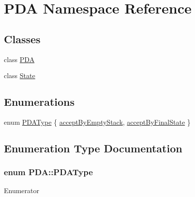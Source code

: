 \hypertarget{namespacePDA}{\section{P\-D\-A Namespace Reference}
\label{namespacePDA}
}
\subsection*{Classes}
\begin{DoxyCompactItemize}
\item 
class \hyperlink{classPDA_1_1PDA}{P\-D\-A}
\item 
class \hyperlink{classPDA_1_1State}{State}
\end{DoxyCompactItemize}
\subsection*{Enumerations}
\begin{DoxyCompactItemize}
\item 
enum \hyperlink{namespacePDA_a2f2b17cdf30facf6f0fe593ab209acf8}{P\-D\-A\-Type} \{ \hyperlink{namespacePDA_a2f2b17cdf30facf6f0fe593ab209acf8abec96ee068d9af07a9bf41137e3b3635}{accept\-By\-Empty\-Stack}, 
\hyperlink{namespacePDA_a2f2b17cdf30facf6f0fe593ab209acf8a68e7e330c1fb2405ce07c4f2600139e1}{accept\-By\-Final\-State}
 \}
\end{DoxyCompactItemize}


\subsection{Enumeration Type Documentation}
\hypertarget{namespacePDA_a2f2b17cdf30facf6f0fe593ab209acf8}{
\subsubsection[{P\-D\-A\-Type}]{\setlength{\rightskip}{0pt plus 5cm}enum {\bf P\-D\-A\-::\-P\-D\-A\-Type}}}\label{namespacePDA_a2f2b17cdf30facf6f0fe593ab209acf8}
\begin{Desc}
\item[Enumerator]\par
\begin{description}
\item[{\em 
\hypertarget{namespacePDA_a2f2b17cdf30facf6f0fe593ab209acf8abec96ee068d9af07a9bf41137e3b3635}{accept\-By\-Empty\-Stack}\label{namespacePDA_a2f2b17cdf30facf6f0fe593ab209acf8abec96ee068d9af07a9bf41137e3b3635}
}]\item[{\em 
\hypertarget{namespacePDA_a2f2b17cdf30facf6f0fe593ab209acf8a68e7e330c1fb2405ce07c4f2600139e1}{accept\-By\-Final\-State}\label{namespacePDA_a2f2b17cdf30facf6f0fe593ab209acf8a68e7e330c1fb2405ce07c4f2600139e1}
}]\end{description}
\end{Desc}
